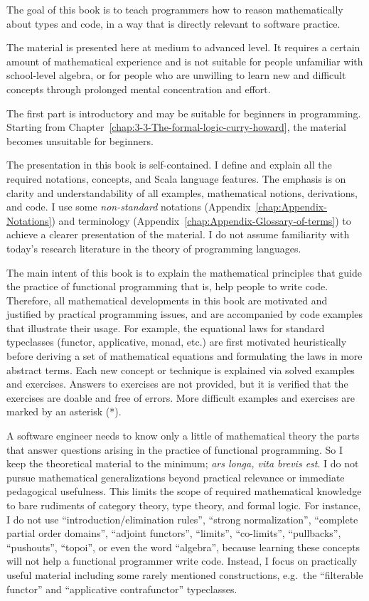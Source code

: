 

The goal of this book is to teach programmers how to reason mathematically
about types and code, in a way that is directly relevant to software
practice.

The material is presented here at medium to advanced level. It requires
a certain amount of mathematical experience and is not suitable for
people unfamiliar with school-level algebra, or for people who are
unwilling to learn new and difficult concepts through prolonged mental
concentration and effort.

The first part is introductory and may be suitable for beginners in
programming. Starting from Chapter~\ref{chap:3-3-The-formal-logic-curry-howard},
the material becomes unsuitable for beginners. 

The presentation in this book is self-contained. I define and explain
all the required notations, concepts, and Scala language features.
The emphasis is on clarity and understandability of all examples,
mathematical notions, derivations, and code. I use some \emph{non-standard}
notations (Appendix~\ref{chap:Appendix-Notations}) and terminology
(Appendix~\ref{chap:Appendix-Glossary-of-terms}) to achieve a clearer
presentation of the material. I do not assume familiarity with today's
research literature in the theory of programming languages.

The main intent of this book is to explain the mathematical principles
that guide the practice of functional programming \textendash{} that
is, help people to write code. Therefore, all mathematical developments
in this book are motivated and justified by practical programming
issues, and are accompanied by code examples that illustrate their
usage. For example, the equational laws for standard typeclasses (functor,
applicative, monad, etc.) are first motivated heuristically before
deriving a set of mathematical equations and formulating the laws
in more abstract terms. Each new concept or technique is explained
via solved examples and exercises. Answers to exercises are not provided,
but it is verified that the exercises are doable and free of errors.
More difficult examples and exercises are marked by an asterisk ({*}).

A software engineer needs to know only a little of mathematical theory
\textendash{} the parts that answer questions arising in the practice
of functional programming. So I keep the theoretical material to the
minimum; \emph{ars longa, vita brevis est}. I do not pursue mathematical
generalizations beyond practical relevance or immediate pedagogical
usefulness. This limits the scope of required mathematical knowledge
to bare rudiments of category theory, type theory, and formal logic.
For instance, I do not use ``introduction/elimination rules'', ``strong
normalization'', ``complete partial order domains'', ``adjoint
functors'', ``limits'', ``co-limits'', ``pullbacks'', ``pushouts'',
``topoi'', or even the word ``algebra'', because learning these
concepts will not help a functional programmer write code. Instead,
I focus on practically useful material \textendash{} including some
rarely mentioned constructions, e.g.~the ``filterable functor''
and ``applicative contrafunctor'' typeclasses.

